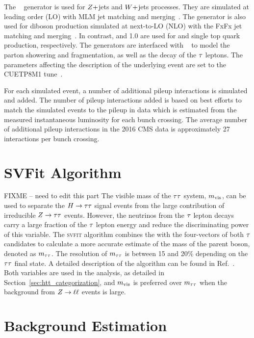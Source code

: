 The \MGAMCNLO~\cite{Alwall:2014hca} generator is used for $Z+$jets and $W+$jets processes. 
They are simulated at leading order (LO) with MLM jet matching and merging~\cite{Alwall:2007fs}.
The \MGAMCNLO generator is also used for diboson production simulated at next-to-LO (NLO) with the 
FxFx jet matching and merging~\cite{Frederix:2012ps}. In contrast,  and 1.0 are used for \ttbar
and single top quark production, respectively. The generators are interfaced with  ~\cite{Sjostrand:2014zea} to model the parton showering and fragmentation, as well as 
the decay of the $\tau$ leptons. The \PYTHIA parameters affecting the description of the 
underlying event are set to the {CUETP8M1} tune~\cite{Khachatryan:2015pea}.

For each simulated event, a number of additional pileup interactions is simulated and added. 
The number of pileup interactions added is based on best efforts to match the simulated
events to the pileup in data which is estimated from the measured instantaneous
luminosity for each bunch crossing. The average number of additional pileup interactions in
the 2016 CMS data is approximately 27 interactions per bunch crossing.


\section{SVFit Algorithm}
\label{sec:svfit}
FIXME -- need to edit this part
The visible mass of the $\tau\tau$ system, $m_\text{vis}$, can be used to separate
the $H\to \tau \tau$ signal events
from the large contribution of irreducible $Z \to \tau \tau$ events.
However, the neutrinos from the $\tau$ lepton decays carry a large fraction of
the $\tau$ lepton energy and reduce the discriminating power of this variable.
The \textsc{svfit} algorithm combines the \etvecmiss with the four-vectors of both $\tau$ candidates
to calculate a more accurate estimate of the mass of the parent boson, denoted as $m_{\tau\tau}$. 
The resolution of $m_{\tau\tau}$ is between 15 and 20\% depending on the $\tau\tau$ final state.
A detailed description of the algorithm can be found
in Ref.~\cite{Bianchini:2014vza}. Both variables are used in the analysis, as detailed in 
Section~\ref{sec:htt_categorization}, and $m_\text{vis}$ is preferred over $m_{\tau\tau}$ when the background 
from $Z \to \ell\ell$ events is large.


\section{Background Estimation}
\label{sec:background_estimation}
